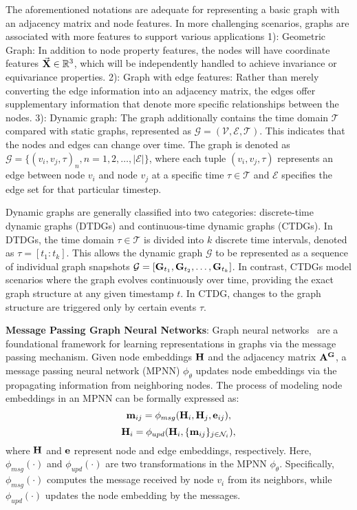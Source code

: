 The aforementioned notations are adequate for representing a basic graph with an adjacency matrix and node features. In more challenging scenarios, graphs are associated with more features to support various applications 1): Geometric Graph: In addition to node property features, the nodes will have coordinate features $\Vec{\mathbf{X}} \in \mathbb{R}^{3}$, which will be independently handled to achieve invariance or equivariance properties.
2): Graph with edge features: Rather than merely converting the edge information into an adjacency matrix, the edges offer supplementary information that denote more specific relationships between the nodes.
3): Dynamic graph: The graph additionally contains the time domain $\mathcal T$ compared with static graphs, represented as $\mathcal G = (\mathcal V, \mathcal E, \mathcal T)$. This indicates that the nodes and edges can change over time. The graph is denoted as $\mathcal G = \{(v_i, v_j, \tau)_n, n = 1, 2, \ldots, |\mathcal E|\}$, where each tuple $(v_i, v_j, \tau)$ represents an edge between node $v_i$ and node $v_j$ at a specific time $\tau \in \mathcal T$ and $\mathcal E$ specifies the edge set for that particular timestep.

Dynamic graphs are generally classified into two categories: discrete-time dynamic graphs (DTDGs) and continuous-time dynamic graphs (CTDGs). In DTDGs, the time domain $\tau \in \mathcal{T}$ is divided into $k$ discrete time intervals, denoted as $\tau = [t_1: t_k]$. This allows the dynamic graph $\mathcal{G}$ to be represented as a sequence of individual graph snapshots $\mathcal{G} = [\mathbf{G}_{t_1}, \mathbf{G}_{t_2}, \ldots, \mathbf{G}_{t_k}]$. In contrast, CTDGs model scenarios where the graph evolves continuously over time,  providing the exact graph structure at any given timestamp $t$. In CTDG, changes to the graph structure are triggered only by certain events $\tau$.

\textbf{Message Passing Graph Neural Networks}: 
Graph neural networks~\cite{kipf2016semi} are a foundational framework for learning representations in graphs via the message passing mechanism. Given node embeddings $\mathbf{H}$ and the adjacency matrix $\mathbf{A}^{\mathbf{G}}$, a message passing neural network (MPNN) $\phi_\theta$ updates  node embeddings via the propagating information from neighboring nodes.
The process of modeling node embeddings in an MPNN can be formally expressed as:
\begin{equation}
    \mathbf{m}_{ij} = \phi_{msg}(\mathbf{H}_i, \mathbf{H}_j, \mathbf{e}_{ij}),
\end{equation}
\begin{equation}
    \mathbf{H}_{i} = \phi_{upd}(\mathbf{H}_i, \{\mathbf{m}_{ij} \}_{j \in \mathcal{N}_i}),
\end{equation}
where $\mathbf{H}$ and $\mathbf{e}$ represent node and edge embeddings, respectively. Here, $\phi_{msg}(\cdot)$ and $\phi_{upd}(\cdot)$ are two transformations in the MPNN $\phi_\theta$.
Specifically, $\phi_{msg}(\cdot)$ computes the message received by node $v_i$ from its neighbors, while $\phi_{upd}(\cdot)$ updates the node embedding by the messages.


